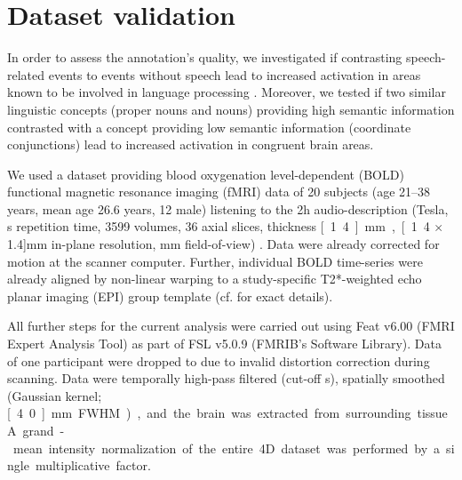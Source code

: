 \documentclass[10pt,a4paper,onecolumn]{article}
\begin{document}
\section*{Dataset validation}
In order to assess the annotation's quality, we investigated if contrasting
speech-related events to events without speech lead to increased activation in
areas known to be involved in language processing \citep{hickok2007cortical}.
Moreover, we tested if two similar linguistic concepts (proper nouns and nouns)
providing high semantic information contrasted with a concept providing low
semantic information (coordinate conjunctions) lead to increased activation in
congruent brain areas.

We used a dataset providing blood oxygenation level-dependent (BOLD) functional
magnetic resonance imaging (fMRI) data of 20 subjects (age 21–38 years, mean age
26.6 years, 12 male) listening to the 2h audio-description (\unit[7]{Tesla},
\unit[2]{s} repetition time, 3599 volumes, 36 axial slices, thickness
\unit[1.4]{mm}, \unit[1.4 $\times$ 1.4]{mm} in-plane resolution, \unit[224]{mm}
field-of-view) \citep{hanke2014audiomovie}.
Data were already corrected for motion at the scanner computer.
Further, individual BOLD time-series were already aligned by non-linear warping
to a study-specific T2*-weighted echo planar imaging (EPI) group template (cf.
\citep{hanke2014audiomovie} for exact details).

All further steps for the current analysis were carried out using Feat v6.00
(FMRI Expert Analysis Tool)\citep{woolrich2001autocorr} as part of FSL v5.0.9
(FMRIB's Software Library)\citep{smith2004fsl}.
Data of one participant were dropped to due to invalid distortion correction
during scanning.
Data were temporally high-pass filtered (cut-off \unit[150]{s}), spatially
smoothed (Gaussian kernel; \unit[4.0]{mm} FWHM), and the brain was extracted
from surrounding tissue.
A grand-mean intensity normalization of the entire 4D dataset was performed by a
single multiplicative factor.
\end{document}
